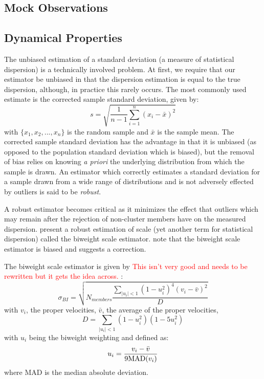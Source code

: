 \documentclass[apj, revtex4]{emulateapj}
\newcommand{\editorial}[1]{\textcolor{red}{#1} }
\begin{document}
\subsection{Mock Observations}

\subsection{Dynamical Properties}
The unbiased estimation of a standard deviation (a measure of statistical dispersion) is a technically involved problem. At first, we require that our estimator be unbiased in that the dispersion estimation is equal to the true dispersion, although, in practice this rarely occurs. The most commonly used estimate is the corrected sample standard deviation, given by:
\begin{equation}
	s = \sqrt{\frac{1}{n-1} \sum_{i=1}^n (x_i - \bar{x})^2}
\end{equation}
with $\{x_1, x_2, ..., x_n\}$ is the random sample and $\bar{x}$ is the sample mean. The corrected sample standard deviation has the advantage in that it is unbiased (as opposed to the population standard deviation which is biased), but the removal of bias relies on knowing \textit{a priori} the underlying distribution from which the sample is drawn. An estimator which correctly estimates a standard deviation for a sample drawn from a wide range of distributions and is not adversely effected by outliers is said to be \textit{robust}.

A robust estimator becomes critical as it minimizes the effect that outliers which may remain after the rejection of non-cluster members have on the measured dispersion. \cite{Beers1990} present a robust estimation of scale (yet another term for statistical dispersion) called the biweight scale estimator. \cite{Ruel2014} note that the biweight scale estimator is biased and suggests a correction. 

The biweight scale estimator is given by \editorial{This isn't very good and needs to be rewritten but it gets the idea across.}:
\begin{equation}
	\sigma_{BI} = \sqrt{ N_{members} \frac{ \sum_{|u_i|<1} (1-u_i^2)^4 (v_i - \bar{v})^2} {D} }
\end{equation}
with $v_i$, the proper velocities, $\bar{v}$, the average of the proper velocities,
\begin{equation}
	D = \sum_{|u_i|<1} (1-u_i^2)(1-5u_i^2)
\end{equation}
with $u_i$ being the biweight weighting and defined as:
\begin{equation}
	u_i = \frac{v_i - \bar{v}}{9 {\rm MAD}(v_i)}
\end{equation}
where MAD is the median absolute deviation.
\end{document}
